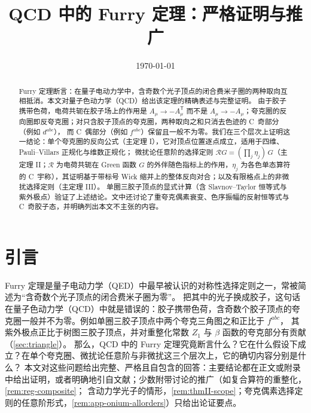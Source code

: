 \documentclass[UTF8,a4paper,11pt,fontset=fandol]{ctexart}
\title{QCD 中的 Furry 定理：严格证明与推广}
\author{}
\date{\today}
\theoremstyle{cplain}
\theoremstyle{cdefinition}
\theoremstyle{cremark}
\numberwithin{equation}{section}
\let\furryorigtableofcontents\tableofcontents
\renewcommand{\tableofcontents}{%
  \begingroup\linespread{1.1}\selectfont\furryorigtableofcontents\endgroup\clearpage}
\newcommand{\tp}{\mathsf{T}}                         %
\newcommand{\Rop}{\mathcal{R}}                       %
\begin{document}
\maketitle

\begin{abstract}
Furry 定理断言：在量子电动力学中，含奇数个光子顶点的闭合费米子圈的两种取向互相抵消。本文对量子色动力学（QCD）给出该定理的精确表述与完整证明。
由于胶子携带色荷，电荷共轭在胶子场上的作用是 $A_\mu\to-A_\mu^{\tp}$ 而不是 $A_\mu\to-A_\mu$；夸克圈的反向圈即反夸克圈；对只含胶子顶点的夸克圈，两种取向之和只消去色迹的 C~奇部分（例如 $d^{abc}$），
而 C~偶部分（例如 $f^{abc}$）保留且一般不为零。我们在三个层次上证明这一结论：单个夸克圈的反向公式（主定理 I），它对顶点位置逐点成立，适用于四维、Pauli--Villars 正规化与维数正规化；
微扰论任意阶的选择定则 $\Rop G=(\prod_j\eta_j)\,G$（主定理 II；$\Rop$ 为电荷共轭在 Green 函数 $G$ 的外伴随色指标上的作用，$\eta_j$ 为各色单态算符的 C~宇称），其证明基于带标号 Wick 缩并上的整体反向对合；以及有限格点上的非微扰选择定则（主定理 III）。
单圈三胶子顶点的显式计算（含 Slavnov--Taylor 恒等式与紫外极点）验证了上述结论。文中还讨论了重夸克偶素衰变、色序振幅的反射恒等式与 C~奇胶子态，并明确列出本文不主张的内容。
\end{abstract}

\tableofcontents

\section{引言}\label{sec:intro}

Furry 定理\cite{Furry1937}是量子电动力学（QED）中最早被认识的对称性选择定则之一，常被简述为“含奇数个光子顶点的闭合费米子圈为零”。
把其中的光子换成胶子，这句话在量子色动力学（QCD）中就是错误的：胶子携带色荷，含奇数个胶子顶点的夸克圈一般并不为零。例如单圈三胶子顶点中两个夸克三角图之和正比于 $f^{abc}$，
其紫外极点正比于树图三胶子顶点\cite{DavydychevOslandSaks2001}，并对重整化常数 $Z_1$ 与 $\beta$ 函数的夸克部分有贡献（\cref{sec:triangle}）。
那么，QCD 中的 Furry 定理究竟断言什么？它在什么假设下成立？在单个夸克圈、微扰论任意阶与非微扰这三个层次上，它的确切内容分别是什么？
本文对这些问题给出完整、严格且自包含的回答：主要结论都在正文或附录中给出证明，或者明确地引自文献；少数附带讨论的推广（如复合算符的重整化，\cref{rem:reg-composite}；
含动力学光子的情形，\cref{rem:thmII-scope}；夸克偶素选择定则的任意阶形式，\cref{rem:app-onium-allorders}）只给出论证要点。
\end{document}
